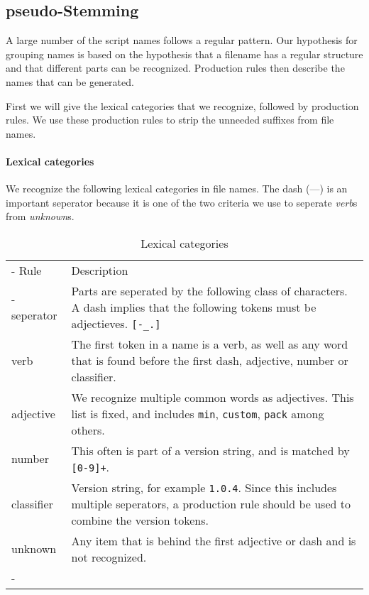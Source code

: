 \subsection{pseudo-Stemming}
A large number of the script names follows a regular pattern. Our hypothesis for grouping names is based on the hypothesis that a filename has a regular structure and that different parts can be recognized. Production rules then describe the names that can be generated.

First we will give the lexical categories that we recognize, followed by production rules. We use these production rules to strip the unneeded suffixes from file names.

\paragraph{Lexical categories}
We recognize the following lexical categories in file names. The dash (---) is an important seperator because it is one of the two criteria we use to seperate \emph{verb}s from \emph{unknown}s.

\begin{table}
	\begin{tabu} to 
		\everyrow{\tabucline-}
		\tabucline-
			\rowfont{\normalfont\bfseries}
			Rule 		& Description \\
		\tabucline-
			seperator 	& Parts are seperated by the following class of characters. A dash implies that the following tokens must be adjectieves. \texttt{[-\_.]} \\
			verb 		& The first token in a name is a verb, as well as any word that is found before the first dash, adjective, number or classifier. \\
			adjective 	& We recognize multiple common words as adjectives. This list is fixed, and includes \texttt{min}, \texttt{custom}, \texttt{pack} among others. \\
			number		& This often is part of a version string, and is matched by \texttt{[0-9]+}. \\
			classifier	& Version string, for example \texttt{1.0.4}. Since this includes multiple seperators, a production rule should be used to combine the version tokens. \\
			unknown 	& Any item that is behind the first adjective or dash and is not recognized. \\
		\tabucline-
	\end{tabu}
	\caption{\label{tab:lexical_categories}Lexical categories}
\end{table}

